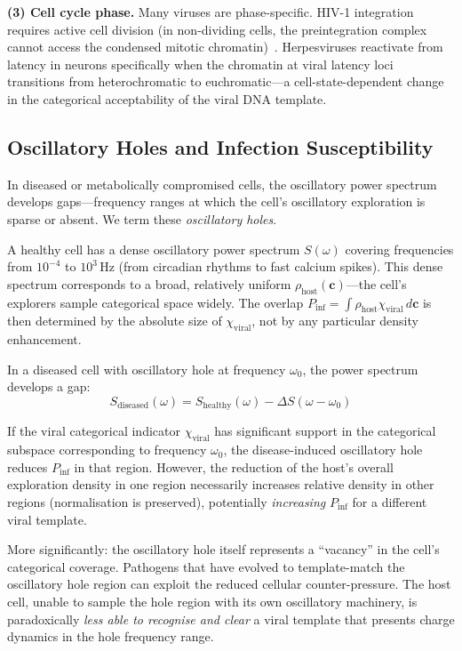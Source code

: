 \documentclass[11pt,twocolumn,a4paper]{article}
\theoremstyle{definition}
\theoremstyle{remark}
\newcommand{\Phost}{\rho_{\mathrm{host}}}
\newcommand{\chiviral}{\chi_{\mathrm{viral}}}
\newcommand{\vv}[1]{\boldsymbol{#1}}
\begin{document}
\textbf{(3) Cell cycle phase.} Many viruses are phase-specific. HIV-1 integration requires active cell division (in non-dividing cells, the preintegration complex cannot access the condensed mitotic chromatin)~\cite{Weinberg1991}. Herpesviruses reactivate from latency in neurons specifically when the chromatin at viral latency loci transitions from heterochromatic to euchromatic---a cell-state-dependent change in the categorical acceptability of the viral DNA template.

\subsection{Oscillatory Holes and Infection Susceptibility}

In diseased or metabolically compromised cells, the oscillatory power spectrum develops gaps---frequency ranges at which the cell's oscillatory exploration is sparse or absent. We term these \emph{oscillatory holes}.

A healthy cell has a dense oscillatory power spectrum $S(\omega)$ covering frequencies from $10^{-4}$ to $10^3$\,Hz (from circadian rhythms to fast calcium spikes). This dense spectrum corresponds to a broad, relatively uniform $\Phost(\vv{c})$---the cell's explorers sample categorical space widely. The overlap $P_{\mathrm{inf}} = \int \Phost \chiviral\,d\vv{c}$ is then determined by the absolute size of $\chiviral$, not by any particular density enhancement.

In a diseased cell with oscillatory hole at frequency $\omega_0$, the power spectrum develops a gap:
\begin{equation}
  S_{\mathrm{diseased}}(\omega) = S_{\mathrm{healthy}}(\omega) - \Delta S(\omega - \omega_0)
\end{equation}

If the viral categorical indicator $\chiviral$ has significant support in the categorical subspace corresponding to frequency $\omega_0$, the disease-induced oscillatory hole reduces $P_{\mathrm{inf}}$ in that region. However, the reduction of the host's overall exploration density in one region necessarily increases relative density in other regions (normalisation is preserved), potentially \emph{increasing} $P_{\mathrm{inf}}$ for a different viral template.

More significantly: the oscillatory hole itself represents a ``vacancy'' in the cell's categorical coverage. Pathogens that have evolved to template-match the oscillatory hole region can exploit the reduced cellular counter-pressure. The host cell, unable to sample the hole region with its own oscillatory machinery, is paradoxically \emph{less able to recognise and clear} a viral template that presents charge dynamics in the hole frequency range.
\end{document}
